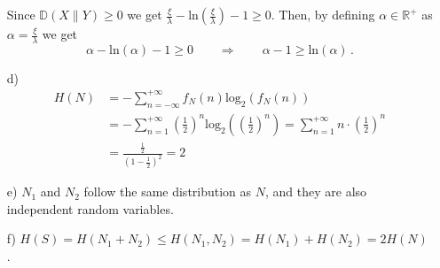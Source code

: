 \begin{itemize}
    Since $\mathbb{D}(X\| Y) \geq 0$ we get $\frac{\xi}{\lambda} - \text{ln}\left(\frac{\xi}{\lambda}\right) - 1 \geq 0$. Then, by defining $\alpha \in \mathbb{R}^{+}$ as $\alpha =  \frac{\xi}{\lambda}$ we get
    $$
    \alpha - \text{ln}(\alpha) - 1 \geq 0 \qquad \Rightarrow \qquad \alpha - 1 \geq \text{ln}(\alpha) \, .
    $$
    \item[d)]
    \begin{align*}
        H(N) &= -\sum_{n = -\infty}^{+\infty} f_{N}(n) \text{log}_2 \left( f_{N}(n) \right) \\
        &= -\sum_{n = 1}^{+\infty} \left( \frac{1}{2} \right)^{n} \text{log}_2 \left( \left( \frac{1}{2} \right)^{n} \right)
        = \sum_{n = 1}^{+\infty} n \cdot \left( \frac{1}{2} \right)^{n} \\
        &= \frac{\frac{1}{2}}{\left(1 - \frac{1}{2}\right)^2} = 2
    \end{align*}
    \item[e)] $N_1$ and $N_2$ follow the same distribution as $N$, and they are also independent random variables.
    \item[f)] $H(S) = H(N_1 + N_2) \leq H(N_1, N_2) = H(N_1) + H(N_2) = 2 H(N)$ .
    
\end{itemize}